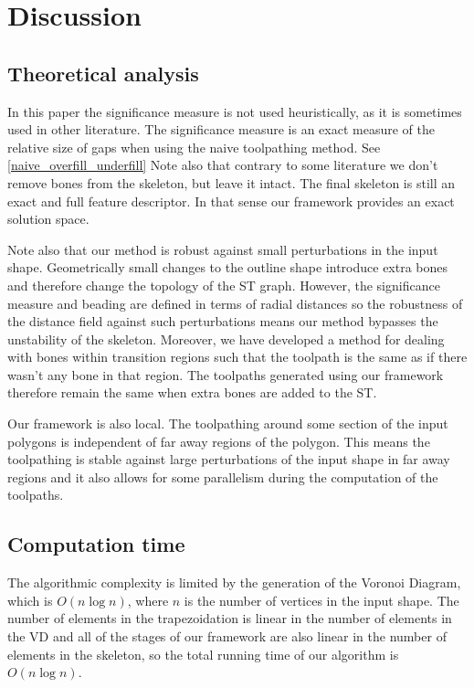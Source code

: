 \section{Discussion}

\subsection{Theoretical analysis}
In this paper the significance measure is not used heuristically, as it is sometimes used in other literature.
The significance measure is an exact measure of the relative size of gaps when using the naive toolpathing method.
See \cref{naive_overfill_underfill}
Note also that contrary to some literature we don't remove bones from the skeleton, but leave it intact.
The final skeleton is still an exact and full feature descriptor.
In that sense our framework provides an exact solution space.

Note also that our method is robust against small perturbations in the input shape.
Geometrically small changes to the outline shape introduce extra bones and therefore change the topology of the ST graph.
However, the significance measure and beading are defined in terms of radial distances so the robustness of the distance field against such perturbations means our method bypasses the unstability of the skeleton.
Moreover, we have developed a method for dealing with bones within transition regions such that the toolpath is the same as if there wasn't any bone in that region.
The toolpaths generated using our framework therefore remain the same when extra bones are added to the ST.

Our framework is also local.
The toolpathing around some section of the input polygons is independent of far away regions of the polygon.
This means the toolpathing is stable against large perturbations of the input shape in far away regions
and it also allows for some parallelism during the computation of the toolpaths.


\subsection{Computation time}
The algorithmic complexity is limited by the generation of the Voronoi Diagram, which is $O(n \log n)$, where $n$ is the number of vertices in the input shape.
The number of elements in the trapezoidation is linear in the number of elements in the VD
and all of the stages of our framework are also linear in the number of elements in the skeleton,
so the total running time of our algorithm is $O(n \log n)$.

